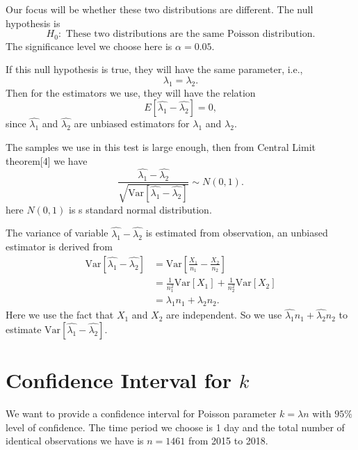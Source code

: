 \documentclass[11pt,a4paper,english]{article}
\begin{document}
Our focus will be whether these two distributions are different. The null hypothesis is 
\begin{equation*}
	H_{0}:\text{ These two distributions are the same Poisson distribution.}
\end{equation*}
The significance level we choose here is $\alpha = 0.05$.

If this null hypothesis is true, they will have the same parameter, i.e.,
\begin{equation*}
	\lambda_{1} = \lambda_{2}.
\end{equation*}
Then for the estimators we use, they will have the relation
\begin{equation*}
	E[\hat{\lambda_{1}}-\hat{\lambda_{2}}] = 0,
\end{equation*}
since $\hat{\lambda_{1}}$ and $\hat{\lambda_{2}}$ are unbiased estimators for $\lambda_{1}$ and $\lambda_{2}$.

The samples we use in this test is large enough, then from Central Limit theorem[4] we have
\begin{equation*}
	\frac{\hat{\lambda_{1}} - \hat{\lambda_{2}}}{\sqrt{\text{Var}\left[\hat{\lambda_{1}} - \hat{\lambda_{2}}\right]}}
	\sim N(0, 1).
\end{equation*}
here $N(0,1)$ is s standard normal distribution.

The variance of variable $\hat{\lambda_{1}}-\hat{\lambda_{2}}$ is estimated from observation, an unbiased estimator is derived from
\begin{align*}
	\text{Var}\left[\hat{\lambda_{1}} - \hat{\lambda_{2}}\right]
	&= \text{Var}\left[\frac{X_{1}}{n_{1}} - \frac{X_{2}}{n_{2}}\right] \\
	&= \frac{1}{n_{1}^{2}}\text{Var}[X_{1}]
	+ \frac{1}{n_{2}^{2}}\text{Var}[X_{2}] \\
	&= \lambda_{1} n_{1} + \lambda_{2} n_{2}.
\end{align*}
Here we use the fact that $X_{1}$ and $X_{2}$ are independent. So we use $\hat{\lambda_{1}}n_{1}+\hat{\lambda_{2}}n_{2}$ to estimate $\text{Var}\left[\hat{\lambda_{1}}-\hat{\lambda_{2}}\right]$.

\section{Confidence Interval for $k$}
We want to provide a confidence interval for Poisson parameter $k = \lambda n$ with $95\%$ level of confidence. 
The time period we choose is 1 day and the total number of identical observations we have is $n = 1461$ from 2015 to 2018.
\end{document}
